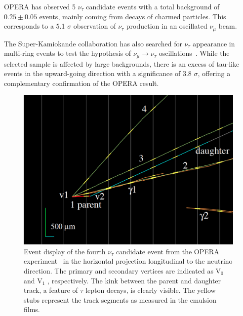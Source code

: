 OPERA has observed 5 $\nu_\tau$ candidate events \cite{Agafonova:2015jxn} with a total background of 
$0.25 \pm 0.05$ events, mainly coming from decays of charmed particles. This corresponds to a 5.1 $\sigma$ observation of $\nu_\tau$ production in an oscillated $\nu_\mu$ beam. 

The Super-Kamiokande collaboration has also searched for $\nu_\tau$ appearance in multi-ring events to test the hypothesis of $\nu_\mu \rightarrow \nu_\tau$ oscillations~\cite{Abe:2012jj}. While the selected sample is affected by large backgrounds, there is an excess of tau-like events in the upward-going direction with a significance of 3.8 $\sigma$, offering a complementary confirmation of the OPERA result.  
 
\begin{figure}[htbp]
\centering
\includegraphics[width=0.6\linewidth]{figures/tau4.pdf}
  \caption{
Event display of the fourth $\nu_\tau$ candidate event from the OPERA 
experiment~\cite{DICRESCENZO2015186} in the
horizontal projection longitudinal to the neutrino direction.
The primary and secondary vertices are indicated as V$_0$ and
V$_1$ , respectively. The kink between the parent and daughter track, a feature of $\tau$ lepton decays, is clearly visible. The yellow stubs represent the track segments as measured in the emulsion films.  
}
 \label{fig:opera}
 \end{figure}

